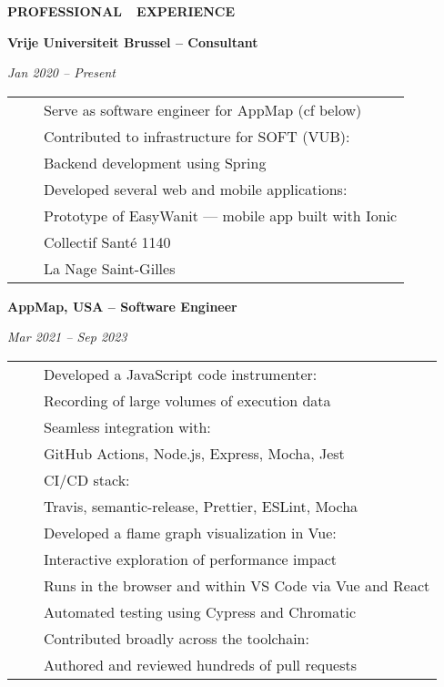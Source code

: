 \documentclass[a4paper,11pt,english]{article}
\newcommand{\MarginColumn}[0]{28pt}
\newcommand{\RightColumn}[0]{10.5cm}
\newcommand{\ItemSkip}[0]{4pt}
\newcommand{\SubItemSkip}[0]{0pt}
\newcommand{\SubSubItemSkip}[0]{0pt}
\newcommand{\Bullet}[0]{\faCaretRight~~}
\newcommand{\BeginSubRubricSkip}[0]{6pt}
\newcommand{\EndSubRubric}[0]{\vspace{4pt}}
\newcommand{\Rubric}[1]{\colorbox{gray!20}{\parbox{\linewidth}{\centering\sffamily\bfseries{}#1}}}
\newcommand{\SubRubric}[1]{\parbox{\linewidth}{\sffamily\bfseries{}#1}}
\begin{document}
\hspace{\MarginColumn}
\begin{minipage}[t]{\RightColumn}
\vspace{-18pt}\Rubric{\faBriefcase \quad PROFESSIONAL~~EXPERIENCE}\vspace{16pt}

\SubRubric{Vrije Universiteit Brussel -- Consultant}

\emph{Jan 2020 -- Present} \\[\BeginSubRubricSkip]
\begin{tabularx}{\linewidth}{@{}l@{}l@{}}
\Bullet & Serve as software engineer for AppMap (cf below) \\[\ItemSkip]
\Bullet & Contributed to infrastructure for SOFT (VUB): \\[\SubItemSkip]
& \quad Backend development using Spring \\[\ItemSkip]
\Bullet & Developed several web and mobile applications: \\[\SubItemSkip]
& \quad Prototype of EasyWanit --- mobile app built with Ionic \\[\SubItemSkip]
& \quad Collectif Santé 1140 \\[\SubItemSkip]
& \quad La Nage Saint-Gilles \\[0pt]
\end{tabularx}
\EndSubRubric{}

\SubRubric{AppMap, USA -- Software Engineer}
\emph{Mar 2021 -- Sep 2023} \\[\BeginSubRubricSkip]
\begin{tabularx}{\linewidth}{@{}l@{}l@{}}
\Bullet & Developed a JavaScript code instrumenter: \\[\SubItemSkip]
& \quad Recording of large volumes of execution data \\[\SubItemSkip]
& \quad Seamless integration with: \\[\SubSubItemSkip]
& \quad \quad GitHub Actions, Node.js, Express, Mocha, Jest \\[\SubItemSkip]
& \quad CI/CD stack: \\[\SubSubItemSkip]
& \quad \quad Travis, semantic-release, Prettier, ESLint, Mocha \\[\ItemSkip]
\Bullet & Developed a flame graph visualization in Vue: \\[\SubItemSkip]
& \quad Interactive exploration of performance impact \\[\SubItemSkip]
& \quad Runs in the browser and within VS Code via Vue and React \\[\SubItemSkip]
& \quad Automated testing using Cypress and Chromatic \\[\ItemSkip]
\Bullet & Contributed broadly across the toolchain: \\[\SubItemSkip]
& \quad Authored and reviewed hundreds of pull requests \\[\ItemSkip]
\end{tabularx}
\EndSubRubric{}


\end{minipage}
\end{document}
